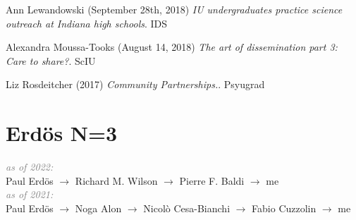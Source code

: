 \documentclass[10pt]{cooperCV2}
\begin{document}
\begin{etaremune}[itemindent=-1.5\bibhang, topsep=0pt,
				   itemsep=\bibsep,partopsep=0pt,parsep=0pt,leftmargin={\bibhang+\widthof{[999]}}]
	
    \item Ann Lewandowski (September 28th, 2018) \textit{IU undergraduates practice science outreach at Indiana high schools}. IDS
     
	
    \item Alexandra Moussa-Tooks (August 14, 2018) \textit{The art of dissemination part 3: Care to share?}. ScIU
     
	
    \item Liz Rosdeitcher (2017) \textit{Community Partnerships.}. Psyugrad
     
	


\end{etaremune}




%
%






%	







\section{Erdös N=3}

\textit{\textcolor{grey}{as of 2022:}}\\
Paul Erdös $\rightarrow$ Richard M. Wilson $\rightarrow$ Pierre F. Baldi $\rightarrow$ me\\


\textit{\textcolor{grey}{as of 2021:}}\\
Paul Erdös $\rightarrow$ Noga Alon $\rightarrow$ Nicolò Cesa-Bianchi $\rightarrow$ Fabio Cuzzolin $\rightarrow$ me\\
\end{document}
